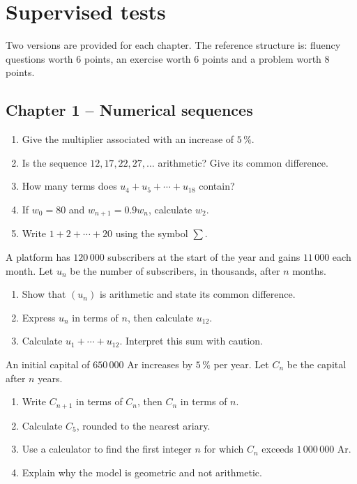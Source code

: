 \chapter{Supervised tests}
Two versions are provided for each chapter. The reference structure is: fluency questions worth 6 points, an exercise worth 6 points and a problem worth 8 points.
\section*{Chapter 1 -- Numerical sequences}
\begin{exercice}[1 -- Fluency]
\begin{enumerate}
\item Give the multiplier associated with an increase of $5\,\%$.
\item Is the sequence $12,17,22,27,\ldots$ arithmetic? Give its common difference.
\item How many terms does $u_4+u_5+\cdots+u_{18}$ contain?
\item If $w_0=80$ and $w_{n+1}=0.9w_n$, calculate $w_2$.
\item Write $1+2+\cdots+20$ using the symbol $\sum$.
\end{enumerate}
\end{exercice}
\begin{exercice}[2 -- Subscriptions]
A platform has $120\,000$ subscribers at the start of the year and gains $11\,000$ each month. Let $u_n$ be the number of subscribers, in thousands, after $n$ months.
\begin{enumerate}
\item Show that $(u_n)$ is arithmetic and state its common difference.
\item Express $u_n$ in terms of $n$, then calculate $u_{12}$.
\item Calculate $u_1+\cdots+u_{12}$. Interpret this sum with caution.
\end{enumerate}
\end{exercice}
\begin{exercice}
An initial capital of $650\,000$ Ar increases by $5\,\%$ per year. Let $C_n$ be the capital after $n$ years.
\begin{enumerate}
\item Write $C_{n+1}$ in terms of $C_n$, then $C_n$ in terms of $n$.
\item Calculate $C_5$, rounded to the nearest ariary.
\item Use a calculator to find the first integer $n$ for which $C_n$ exceeds $1\,000\,000$ Ar.
\item Explain why the model is geometric and not arithmetic.
\end{enumerate}
\end{exercice}

